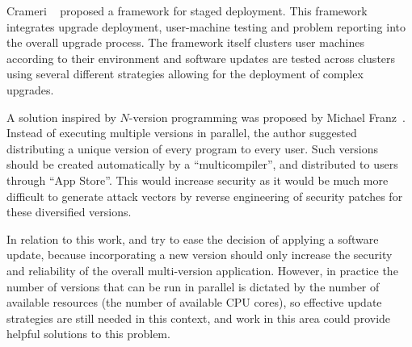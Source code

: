 Crameri \etal~\cite{crameri:updates} proposed a framework for staged
deployment. This framework integrates upgrade deployment, user-machine testing
and problem reporting into the overall upgrade process. The framework itself
clusters user machines according to their environment and software updates are
tested across clusters using several different strategies allowing for the
deployment of complex upgrades.

A solution inspired by $N$-version programming was proposed by Michael
Franz~\cite{unibus:nspw10}. Instead of executing multiple versions in parallel,
the author suggested distributing a unique version of every program to every
user. Such versions should be created automatically by a ``multicompiler'',
and distributed to users through ``App Store''. This would increase security as
it would be much more difficult to generate attack vectors by reverse
engineering of security patches for these diversified versions.



In relation to this work, \mx and \varan try to ease the decision of applying a
software update, because incorporating a new version should only increase the
security and reliability of the overall multi-version application.  However, in
practice the number of versions that can be run in parallel is dictated by the
number of available resources (\eg the number of available CPU cores), so
effective update strategies are still needed in this context, and work in this
area could provide helpful solutions to this problem.

